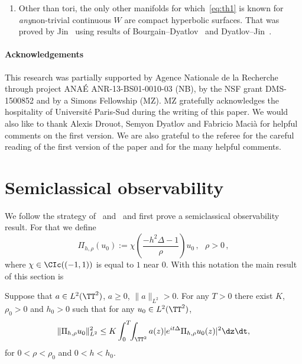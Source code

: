 \begin{remasc*}
\begin{enumerate}
\item \label{rem4} Other than tori, the only other manifolds for which~\eqref{eq:th1} is known for \emph{any}\linebreak non-trivial continuous $ W $ are compact hyperbolic surfaces. That was proved by Jin~\cite{Ji} using results of Bourgain--Dyatlov~\cite{BD} and Dyatlov--Jin~\cite{DJ}.
\end{enumerate}
\end{remasc*}

\paragraph*{Acknowledgements}
This research was partially supported by Agence Nationale de la Recherche through project ANAÉ ANR-13-BS01-0010-03 (NB), by the NSF grant DMS-1500852 and by a Simons Fellowship (MZ). MZ gratefully acknowledges the hospitality of Université Paris-Sud during the writing of this paper. We would also like to thank Alexis Drouot, Semyon Dyatlov and Fabricio Macià for helpful comments on the first version. We are also grateful to the referee for the careful reading of the first version of the paper and for the many helpful comments.


\section{Semiclassical observability}

We follow the strategy of~\cite{BZ4} and~\cite{BBZ} and first prove a semiclassical observability result. For that we define
\begin{equation}\label{eq:Pih}
\Pi_{h, \rho} (u_0) := \chi \left(\frac{ - h^2\Delta - 1} {\rho} \right) u_0\,, \ \ \ \rho > 0 \,,
\end{equation}
where $ \chi \in \CIc ((- 1, 1))$ is equal to $ 1 $ near $ 0 $. With this notation the main result of this section is
\begin{prop}\label{p:semi}
Suppose that $ a \in L^2 (\TT^2) $, $ a \geq 0 $, $ \| a \|_{L^2} > 0 $. For any $ T > 0 $ there exist $ K $, $ \rho_0 > 0 $ and $ h_0 > 0 $ such that for any $ u_0 \in L^2 (\TT^2) $,
\begin{equation}\label{eq:semi}
\| \Pi_{h, \rho} u_0 \|_{ L^2 }^2 \leq K \int_0^T \!\!\int_{ \TT^2} a (z) | e^{ i t \Delta} \Pi_{h, \rho} u_0 (z) |^2 \dz \dt,
\end{equation}
for $ 0 < \rho < \rho_0 $ and $ 0 < h < h_0 $.
\end{prop}

